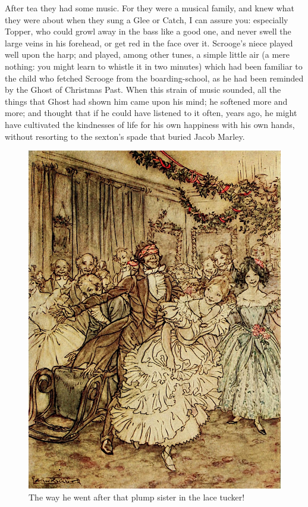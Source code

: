 \documentclass[paper=5.5in:8.5in,BCOR=15mm,twoside,DIV=15,headinclude=off,12pt,chapterprefix=off,openany,headings=huge]{scrbook} %
\begin{document}
After tea they had some music. For they were a musical family, and knew what they were about when they sung a Glee or Catch, I can assure you: especially Topper, who could growl away in the bass like a good one, and never swell the large veins in his forehead, or get red in the face over it. Scrooge's niece played well upon the harp; and played, among other tunes, a simple little air (a mere nothing: you might learn to whistle it in two minutes) which had been familiar to the child who fetched Scrooge from the boarding-school, as he had been reminded by the Ghost of Christmas Past. When this strain of music sounded, all the things that Ghost had shown him came upon his mind; he softened more and more; and thought that if he could have listened to it often, years ago, he might have cultivated the kindnesses of life for his own happiness with his own hands, without resorting to the sexton's spade that buried Jacob Marley.

\begin{figure}[p]
\begin{minipage}[c]{\linewidth}
\includegraphics[width=\linewidth]{fredpartyimproved}
\caption*{The way he went after that plump sister in the lace tucker!}
\end{minipage}
\end{figure}
\end{document}
